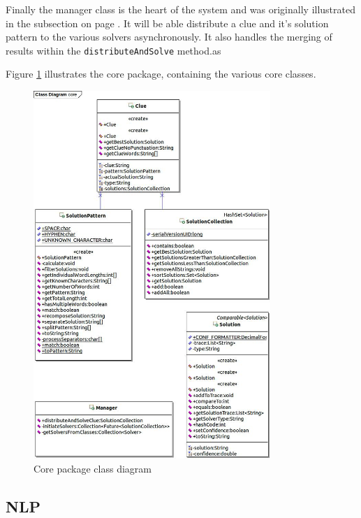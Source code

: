 Finally the manager class is the heart of the system and was originally 
illustrated in the subsection  on page 
\pageref{sub:solving_a_clue}. It will be able distribute a clue and it's 
solution pattern to the various solvers asynchronously. It also handles the 
merging of results within the \texttt{distributeAndSolve} method.as

Figure \ref{fig:core_package} illustrates the core package, containing the 
various core classes.

\begin{figure}[H]
  \centering
  \includegraphics[width=0.8\textwidth]{design/class/core.jpg}
  \caption{Core package class diagram}
  \label{fig:core_package}
\end{figure}


\subsection{NLP}
\label{sub:nlp}

